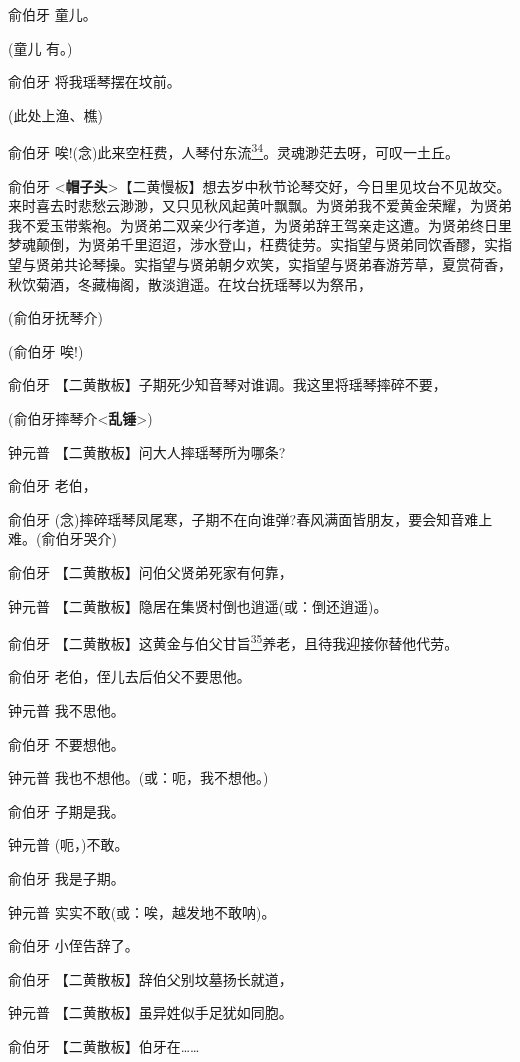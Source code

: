 俞伯牙 童儿。

(童儿 有。)

俞伯牙 将我瑶琴摆在坟前。

(此处上渔、樵)

俞伯牙
唉!(念)此来空枉费，人琴付东流\protect\hyperlink{fn34}{\textsuperscript{34}}。灵魂渺茫去呀，可叹一土丘。

俞伯牙
\textless{}\textbf{帽子头}\textgreater{}【二黄慢板】想去岁中秋节论琴交好，今日里见坟台不见故交。来时喜去时悲愁云渺渺，又只见秋风起黄叶飘飘。为贤弟我不爱黄金荣耀，为贤弟我不爱玉带紫袍。为贤弟二双亲少行孝道，为贤弟辞王驾亲走这遭。为贤弟终日里梦魂颠倒，为贤弟千里迢迢，涉水登山，枉费徒劳。实指望与贤弟同饮香醪，实指望与贤弟共论琴操。实指望与贤弟朝夕欢笑，实指望与贤弟春游芳草，夏赏荷香，秋饮菊酒，冬藏梅阁，散淡逍遥。在坟台抚瑶琴以为祭吊，

(俞伯牙抚琴介)

(俞伯牙 唉!)

俞伯牙 【二黄散板】子期死少知音琴对谁调。我这里将瑶琴摔碎不要，

(俞伯牙摔琴介\textless{}\textbf{乱锤}\textgreater{})

钟元普 【二黄散板】问大人摔瑶琴所为哪条?

俞伯牙 老伯，

俞伯牙
(念)摔碎瑶琴凤尾寒，子期不在向谁弹?春风满面皆朋友，要会知音难上难。(俞伯牙哭介)

俞伯牙 【二黄散板】问伯父贤弟死家有何靠，

钟元普 【二黄散板】隐居在集贤村倒也逍遥(或：倒还逍遥)。

俞伯牙
【二黄散板】这黄金与伯父甘旨\protect\hyperlink{fn35}{\textsuperscript{35}}养老，且待我迎接你替他代劳。

俞伯牙 老伯，侄儿去后伯父不要思他。

钟元普 我不思他。

俞伯牙 不要想他。

钟元普 我也不想他。(或：呃，我不想他。)

俞伯牙 子期是我。

钟元普 (呃，)不敢。

俞伯牙 我是子期。

钟元普 实实不敢(或：唉，越发地不敢呐)。

俞伯牙 小侄告辞了。

俞伯牙 【二黄散板】辞伯父别坟墓扬长就道，

钟元普 【二黄散板】虽异姓似手足犹如同胞。

俞伯牙 【二黄散板】伯牙在\ldots{}\ldots{}


